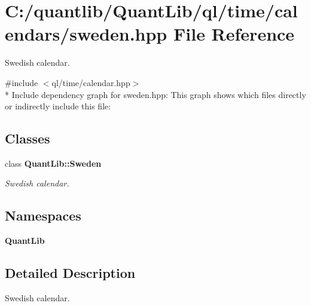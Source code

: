 \section{C\+:/quantlib/\+Quant\+Lib/ql/time/calendars/sweden.hpp File Reference}
\label{sweden_8hpp}


Swedish calendar.  


{\ttfamily \#include $<$ql/time/calendar.\+hpp$>$}\\*
Include dependency graph for sweden.\+hpp\+:
This graph shows which files directly or indirectly include this file\+:
\subsection*{Classes}
\begin{DoxyCompactItemize}
\item 
class {\bf Quant\+Lib\+::\+Sweden}
\begin{DoxyCompactList}\small\item\em Swedish calendar. \end{DoxyCompactList}\end{DoxyCompactItemize}
\subsection*{Namespaces}
\begin{DoxyCompactItemize}
\item 
 {\bf Quant\+Lib}
\end{DoxyCompactItemize}


\subsection{Detailed Description}
Swedish calendar. 

